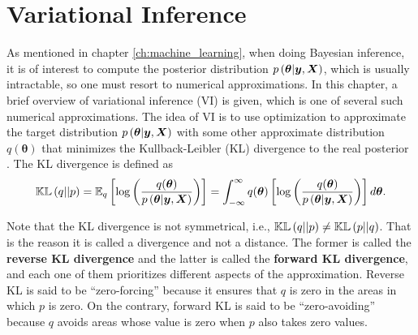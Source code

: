 
\chapter{Variational Inference}
\label{ch:variational_inference}



As mentioned in chapter \ref{ch:machine_learning}, when doing Bayesian inference, it is of interest to compute the posterior distribution $p\left( \boldsymbol{\theta} | \boldsymbol{y}, \boldsymbol{X} \right)$, which is usually intractable, so one must resort to numerical approximations. In this chapter, a brief overview of variational inference (VI) is given, which is one of several such numerical approximations. The idea of VI is to use optimization to approximate the target distribution $p\left( \boldsymbol{\theta} | \boldsymbol{y}, \boldsymbol{X} \right)$ with some other approximate distribution $q(\boldsymbol{\theta})$ that minimizes the Kullback-Leibler (KL) divergence to the real posterior \cite{blei2017variational}. The KL divergence is defined as
\begin{equation}
  \label{eq:kl_divergence}
  \mathbb{KL}\left( q || p \right) = \mathbb{E}_q \left[ \log \left( \frac{q(\boldsymbol{\theta})}{p\left( \boldsymbol{\theta} | \boldsymbol{y}, \boldsymbol{X} \right)} \right) \right] = \int_{-\infty}^{\infty} q(\boldsymbol{\theta}) \left[ \log \left( \frac{q(\boldsymbol{\theta})}{p\left( \boldsymbol{\theta} | \boldsymbol{y}, \boldsymbol{X} \right)} \right) \right] d\boldsymbol{\theta}.
\end{equation}

Note that the KL divergence is not symmetrical, i.e., $\mathbb{KL}\left( q || p \right) \neq \mathbb{KL}\left( p || q \right)$. That is the reason it is called a divergence and not a distance. The former is called the \textbf{reverse KL divergence} and the latter is called the \textbf{forward KL divergence}, and each one of them prioritizes different aspects of the approximation. Reverse KL is said to be ``zero-forcing'' because it ensures that $q$ is zero in the areas in which $p$ is zero. On the contrary, forward KL is said to be ``zero-avoiding'' because $q$ avoids areas whose value is zero when $p$ also takes zero values.

